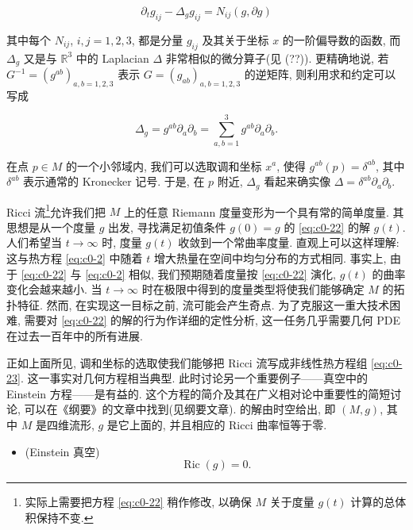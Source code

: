 \begin{equation}\label{eq:c0-23}
\partial_{t} g_{i j} - \Delta_{g} g_{i j} = N_{i j}(g, \partial g)
\end{equation}

其中每个 $N_{i j}$, $i, j = 1, 2, 3$, 都是分量 $g_{i j}$ 及其关于坐标 $x$ 的一阶偏导数的函数, 而 $\Delta_{g}$ 又是与 $\mathbb{R}^{3}$ 中的 Laplacian $\Delta$ 非常相似的微分算子(见 (??)).
更精确地说, 若 $G^{-1} = (g^{a b})_{a, b = 1, 2, 3}$ 表示 $G = (g_{a b})_{a, b = 1, 2, 3}$ 的逆矩阵, 则利用求和约定可以写成

\[
\Delta_{g} = g^{a b} \partial_{a} \partial_{b} = \sum_{a, b = 1}^{3} g^{a b} \partial_{a} \partial_{b}.
\]

在点 $p \in M$ 的一个小邻域内, 我们可以选取调和坐标 $x^{a}$, 使得 $g^{a b}(p) = \delta^{a b}$, 其中 $\delta^{a b}$ 表示通常的 Kronecker 记号.
于是, 在 $p$ 附近, $\Delta_{g}$ 看起来确实像 $\Delta = \delta^{a b} \partial_{a} \partial_{b}$.

Ricci 流\footnote{实际上需要把方程 \eqref{eq:c0-22} 稍作修改, 以确保 $M$ 关于度量 $g(t)$ 计算的总体积保持不变.}允许我们把 $M$ 上的任意 Riemann 度量变形为一个具有常的简单度量.
其思想是从一个度量 $g$ 出发, 寻找满足初值条件 $g(0) = g$ 的 \eqref{eq:c0-22} 的解 $g(t)$.
人们希望当 $t \to \infty$ 时, 度量 $g(t)$ 收敛到一个常曲率度量.
直观上可以这样理解:这与热方程 \eqref{eq:c0-2} 中随着 $t$ 增大热量在空间中均匀分布的方式相同.
事实上, 由于 \eqref{eq:c0-22} 与 \eqref{eq:c0-2} 相似, 我们预期随着度量按 \eqref{eq:c0-22} 演化, $g(t)$ 的曲率变化会越来越小.
当 $t \to \infty$ 时在极限中得到的度量类型将使我们能够确定 $M$ 的拓扑特征.
然而, 在实现这一目标之前, 流可能会产生奇点.
为了克服这一重大技术困难, 需要对 \eqref{eq:c0-22} 的解的行为作详细的定性分析, 这一任务几乎需要几何 PDE 在过去一百年中的所有进展.

正如上面所见, 调和坐标的选取使我们能够把 Ricci 流写成非线性热方程组 \eqref{eq:c0-23}.
这一事实对几何方程相当典型.
此时讨论另一个重要例子——真空中的 Einstein 方程——是有益的.
这个方程的简介及其在广义相对论中重要性的简短讨论, 可以在《纲要》的文章中找到(见纲要文章).
的解由时空给出, 即 $(M, g)$, 其中 $M$ 是四维流形, $g$ 是它上面的, 并且相应的 Ricci 曲率恒等于零.

\begin{itemize}
\item (Einstein 真空)
\begin{equation}\label{eq:c0-24}
\operatorname{Ric}(g) = 0.
\end{equation}
\end{itemize}

